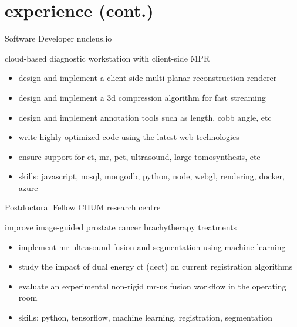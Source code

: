 \documentclass[print]{friggeri-cv}
\begin{document}
\clearpage
\section{experience (cont.)}
\begin{entrylist}
  {Software Developer} {nucleus.io}
  {cloud-based diagnostic workstation with client-side {\small MPR}
  \begin{itemize}
    \item design and implement a client-side multi-planar reconstruction renderer
    \item design and implement a 3d compression algorithm for fast streaming
    \item design and implement annotation tools such as length, cobb angle, etc
    \item write highly optimized code using the latest web technologies
    \item ensure support for ct, mr, pet, ultrasound, large tomosynthesis, etc
    \item skills: javascript, nosql, mongodb, python, node, webgl, rendering, docker, azure
  \end{itemize}}

  {Postdoctoral Fellow}
  {CHUM research centre}
  {improve image-guided prostate cancer brachytherapy treatments
  \begin{itemize}
    \item implement mr-ultrasound fusion and segmentation using machine learning
    \item study the impact of dual energy ct (dect) on current registration algorithms
    \item evaluate an experimental non-rigid mr-us fusion workflow in the operating room
    \item skills: python, tensorflow, machine learning, registration, segmentation
  \end{itemize}}




\end{entrylist}
\end{document}

